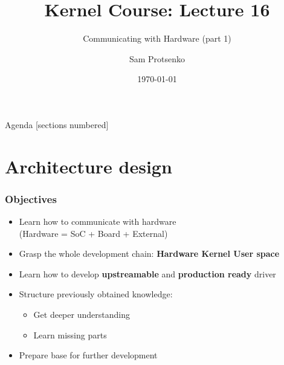 \documentclass[aspectratio=169,usenames,dvipsnames]{beamer}
\title{Kernel Course: Lecture 16}
\subtitle{Communicating with Hardware (part 1)}
\date{\today}
\author{Sam Protsenko}
\institute{GlobalLogic}
\newcounter{cont}
\begin{document}

\maketitle

\begin{frame}{Agenda}
  [sections numbered]
  \tableofcontents[hideallsubsections]
\end{frame}

\section{Architecture design}

\begin{frame}
  \frametitle{Objectives}
  \begin{itemize}
    \item Learn how to communicate with hardware \\
          (Hardware = SoC + Board + External)
    \item Grasp the whole development chain: \textbf{Hardware \textrightarrow{}
          Kernel \textrightarrow{} User space}
    \item Learn how to develop \textbf{upstreamable} and
          \textbf{production ready} driver
    \item Structure previously obtained knowledge:
    \begin{itemize}
      \item Get deeper understanding
      \item Learn missing parts
    \end{itemize}
    \item Prepare base for further development
  \end{itemize}
\end{frame}
\end{document}
